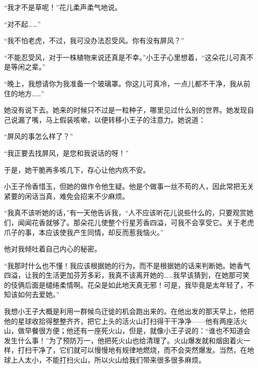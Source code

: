 “我才不是草呢！”花儿柔声柔气地说。

“对不起\ldots{}\ldots{}”

“我不怕老虎，不过，我可没办法忍受风。你有没有屏风？”

{\startalignment[center]
 \stopalignment}

“不能忍受风，对于一株植物来说还真是不幸。”小王子心里想着，“这朵花儿可真不是等闲之辈。”

“晚上，我想请你为我准备一个玻璃罩。你这儿可真冷，一点儿都不干净，我从前住的地方\ldots{}\ldots{}”

她没有说下去。她来的时候只不过是一粒种子，哪里见过什么别的世界。她发现自己说漏了嘴，马上假装咳嗽，以便转移小王子的注意力。她说道：

“屏风的事怎么样了？”

“我正要去找屏风，是您和我说话的呀！”

于是，她干脆再多咳几下，存心让他内疚不安。

小王子怜香惜玉，但她的做作令他生疑。他是个做事一丝不苟的人，因此常把无关紧要的闲话当真，难免会招来不少麻烦。

“我真不该听她的话，”有一天他告诉我，“人不应该听花儿说些什么的，只要观赏她们，闻闻花香就够了。那朵花儿使整个行星芳香四溢，可我不会享受它。关于老虎爪子的事，本应该使我产生同情，却反而惹我恼火。”

{\startalignment[center]
 \stopalignment}

他对我倾吐着自己内心的秘密。

“我那时什么也不懂！我应该根据她的行为，而不是根据她的话来判断她。她香气四溢，让我的生活更加芬芳多彩，我真不该离开她的\ldots{}\ldots{}我早该猜到，在她那可笑的伎俩后面是缱绻柔情啊。花朵是如此地天真无邪！可是，我毕竟是太年轻了，不知该如何去爱她。”

{\startalignment[center]
 \stopalignment}


\stoptitle

\starttitle[title={9}]

我想小王子大概是利用一群候鸟迁徙的机会跑出来的。在他出发的那天早上，他把他的星球收拾得整整齐齐，把它上头的活火山打扫得干干净净------他有两座活火山，做早餐很方便；他还有一座死火山，但是，就像小王子说的：“谁也不知道会发生什么事！”为了预防万一，他把死火山也给清理了。火山爆发就和烟囱着火一样，打扫干净了，它们就可以慢慢地有规律地燃烧，而不会突然爆发。当然，在地球上人太小，不能打扫火山，所以火山给我们带来很多很多麻烦。

